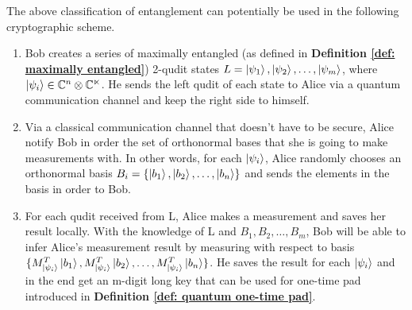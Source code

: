 The above classification of entanglement can potentially be used in the following cryptographic scheme.
\begin{enumerate}
    \item Bob creates a series of maximally entangled (as defined in \textbf{Definition \ref{def: maximally entangled}}) 2-qudit states $L={\ket{\psi_1}, \ket{\psi_2}, \hdots, \ket{\psi_m}}$, where $\ket{\psi_i} \in \mathbb{C}^n \otimes \mathbb{C^n}$. He sends the left qudit of each state to Alice via a quantum communication channel and keep the right side to himself.
    \item Via a classical communication channel that doesn't have to be secure, Alice notify Bob in order the set of orthonormal bases that she is going to make measurements with. In other words, for each $\ket{\psi_i}$, Alice randomly chooses an orthonormal basis $B_i=\{\ket{b_1}, \ket{b_2}, \hdots, \ket{b_n}\}$ and sends the elements in the basis in order to Bob.
    \item For each qudit received from L, Alice makes a measurement and saves her result locally. With the knowledge of L and $B_1, B_2, \hdots, B_m$, Bob will be able to infer Alice's measurement result by measuring with respect to basis $\{M_{\ket{\psi_i}}^T \ket{b_1}, M_{\ket{\psi_i}}^T \ket{b_2}, \hdots, M_{\ket{\psi_i}}^T \ket{b_n}\}$. He saves the result for each $\ket{\psi_i}$ and in the end get an m-digit long key that can be used for one-time pad introduced in \textbf{Definition \ref{def: quantum one-time pad}}.
\end{enumerate}